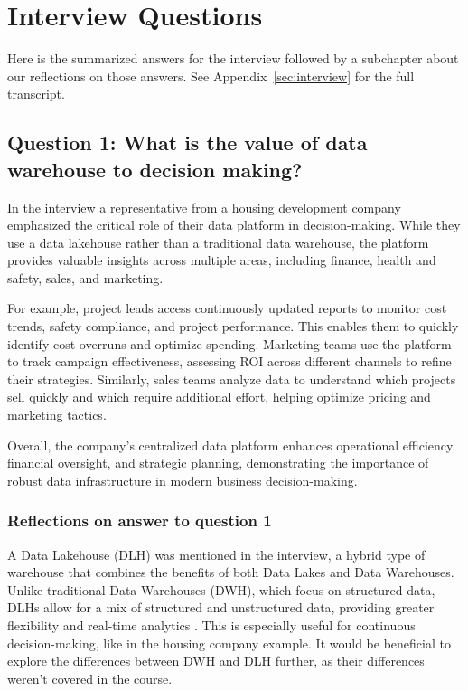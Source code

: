 \section{Interview Questions}
Here is the summarized answers for the interview followed by a subchapter about our reflections on those answers. See Appendix~\ref{sec:interview} for the full transcript.
\subsection{Question 1: What is the value of data warehouse to decision making?}

In the interview a representative from a housing development company emphasized the critical role of their data platform 
in decision-making. While they use a data lakehouse rather than a traditional data warehouse, the platform provides valuable 
insights across multiple areas, including finance, health and safety, sales, and marketing.

For example, project leads access continuously updated reports to monitor cost trends, safety compliance, and project performance. 
This enables them to quickly identify cost overruns and optimize spending. Marketing teams use the platform to track campaign 
effectiveness, assessing ROI across different channels to refine their strategies. Similarly, sales teams analyze data to understand 
which projects sell quickly and which require additional effort, helping optimize pricing and marketing tactics.

Overall, the company's centralized data platform enhances operational efficiency, financial oversight, and strategic planning, 
demonstrating the importance of robust data infrastructure in modern business decision-making.
\subsubsection{Reflections on answer to question 1}
A Data Lakehouse (DLH) was mentioned in the interview, a hybrid type of warehouse that combines the benefits of both Data Lakes and Data Warehouses. 
Unlike traditional Data Warehouses (DWH), which focus on structured data, DLHs allow for a mix of structured and unstructured data, 
providing greater flexibility and real-time analytics \cite{datalakehouse}. This is especially useful for continuous decision-making, like in the housing company example. 
It would be beneficial to explore the differences between DWH and DLH further, as their differences weren't covered in the course.

